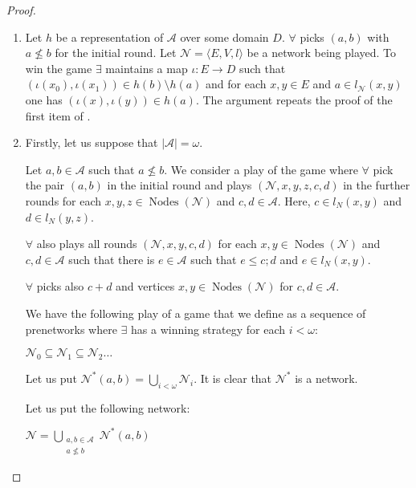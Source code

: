 \documentclass[a4paper]{article}
\theoremstyle{definition}
\theoremstyle{theorem}
\theoremstyle{proposition}
\theoremstyle{lemma}
\theoremstyle{ex}
\theoremstyle{corollary}
\theoremstyle{claim}
\begin{document}
\begin{proof}
$ $

  \begin{enumerate}
    \item Let $h$ be a representation of $\mathcal{A}$ over some domain $D$. $\forall$ picks $(a, b)$ with $a \not\leq b$ for the initial round. Let $\mathcal{N} = \langle E, V, l \rangle$ be a network being played. To win the game $\exists$ maintains a map $\iota : E \to D$ such that $(\iota(x_0), \iota(x_1)) \in h(b) \setminus h(a)$ and for each $x, y \in E$ and
    $a \in l_{\mathcal{N}}(x, y)$ one has $(\iota(x), \iota(y)) \in h(a)$. The argument repeats the proof of the first item of \cite[Proposition 5]{hirsch2005class}.

    \item
    Firstly, let us suppose that $|\mathcal{A}| = \omega$.

    Let $a, b \in \mathcal{A}$ such that $a \not\leq b$. We consider a play of the game where $\forall$ pick the pair $(a, b)$ in the initial round and plays $(\mathcal{N}, x, y, z, c, d)$ in the further rounds for each $x, y, z \in \operatorname{Nodes}(\mathcal{N})$ and $c,d \in \mathcal{A}$. Here, $c \in l_N(x, y)$ and $d \in l_N(y, z)$.

    $\forall$ also plays all rounds $(\mathcal{N},x,y,c,d)$ for each $x, y \in \operatorname{Nodes}(\mathcal{N})$ and $c,d \in \mathcal{A}$ such that there is $e \in \mathcal{A}$ such that
    $e \leq c ; d$ and $e \in l_N(x,y)$.

    $\forall$ picks also $c + d$ and vertices $x,y \in \operatorname{Nodes}(\mathcal{N})$ for $c, d \in \mathcal{A}$.

    We have the following play of a game that we define as a sequence of prenetworks where $\exists$ has a winning strategy for each $i < \omega$:

    \begin{center}
      $\mathcal{N}_0 \subseteq \mathcal{N}_1 \subseteq \mathcal{N}_2 \dots$
    \end{center}

    Let us put $\mathcal{N}^{*}(a, b) = \bigcup \limits_{i < \omega} \mathcal{N}_i$. It is clear that $\mathcal{N}^{*}$ is a network.

    Let us put the following network:

    \begin{center}
      $\mathcal{N} = \bigcup \limits_{\substack{a, b \in \mathcal{A} \\ a \not\leq b}} \mathcal{N}^{*}(a,b)$
    \end{center}


\end{enumerate}
\end{proof}
\end{document}
